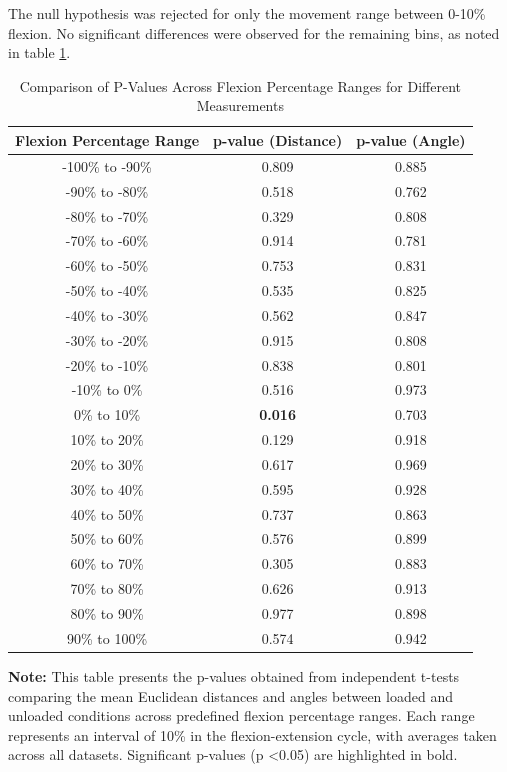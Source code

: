 \documentclass{micro-econ-thesis}
\begin{document}
The null hypothesis was rejected for only the movement range between 0-10\% flexion. No significant differences were observed for the remaining bins, as noted in table \ref{tab:p_values_combined}. 
\begin{table}[H]
	\centering
	\caption{Comparison of P-Values Across Flexion Percentage Ranges for Different Measurements}
	\label{tab:p_values_combined}
	\begin{tabular}{@{}ccc@{}}
		\toprule
		Flexion Percentage Range & p-value (Distance) & p-value (Angle) \\ \midrule
		-100\% to -90\% & 0.809 & 0.885 \\
		-90\% to -80\% & 0.518 & 0.762 \\
		-80\% to -70\% & 0.329 & 0.808 \\
		-70\% to -60\% & 0.914 & 0.781 \\
		-60\% to -50\% & 0.753 & 0.831 \\
		-50\% to -40\% & 0.535 & 0.825 \\
		-40\% to -30\% & 0.562 & 0.847 \\
		-30\% to -20\% & 0.915 & 0.808 \\
		-20\% to -10\% & 0.838 & 0.801 \\
		-10\% to 0\% & 0.516 & 0.973 \\
		0\% to 10\% & \textbf{0.016} & 0.703 \\
		10\% to 20\% & 0.129 & 0.918 \\
		20\% to 30\% & 0.617 & 0.969 \\
		30\% to 40\% & 0.595 & 0.928 \\
		40\% to 50\% & 0.737 & 0.863 \\
		50\% to 60\% & 0.576 & 0.899 \\
		60\% to 70\% & 0.305 & 0.883 \\
		70\% to 80\% & 0.626 & 0.913 \\
		80\% to 90\% & 0.977 & 0.898 \\
		90\% to 100\% & 0.574 & 0.942 \\
		\bottomrule
	\end{tabular}
	\begin{minipage}[t]{\linewidth} %
		\bigskip
		\textbf{Note:} This table presents the p-values obtained from independent t-tests comparing the mean Euclidean distances and angles between loaded and unloaded conditions across predefined flexion percentage ranges. Each range represents an interval of 10\% in the flexion-extension cycle, with averages taken across all datasets. Significant p-values (p \textless 0.05) are highlighted in bold.
	\end{minipage}
\end{table}
\end{document}
